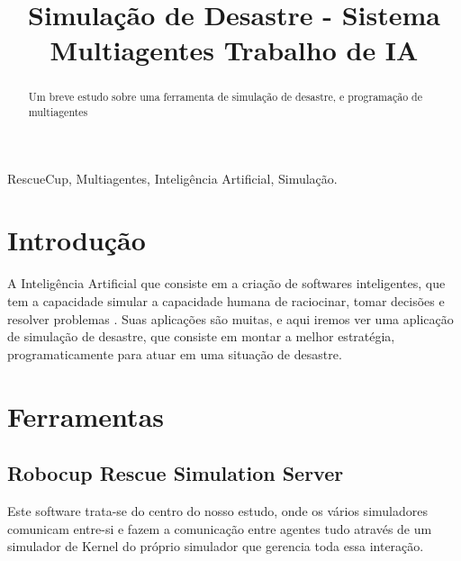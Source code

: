 \documentclass[conference]{IEEEtran}
\begin{document}
\title{Simulação de Desastre - Sistema Multiagentes  Trabalho de IA\\
}

\author{
}

\maketitle

\begin{abstract}
Um breve estudo sobre uma ferramenta de simulação de desastre, e programação de multiagentes
\end{abstract}

\begin{IEEEkeywords}
RescueCup, Multiagentes, Inteligência Artificial, Simulação.
\end{IEEEkeywords}

\section{Introdução}
A Inteligência Artificial que consiste em a criação de softwares inteligentes, que tem a capacidade simular a capacidade humana de raciocinar, tomar decisões e resolver problemas . Suas aplicações são muitas, e aqui iremos ver uma aplicação de simulação de desastre, que consiste em montar a melhor estratégia, programaticamente para atuar em uma situação de desastre.

\section{Ferramentas}

\subsection{Robocup Rescue Simulation Server}

Este software trata-se do centro do nosso estudo, onde os vários simuladores comunicam entre-si e fazem a comunicação entre agentes tudo através de um simulador de Kernel do próprio simulador que gerencia toda essa interação.
\end{document}
